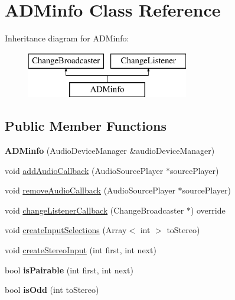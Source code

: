 \hypertarget{class_a_d_minfo}{}\section{A\+D\+Minfo Class Reference}
\label{class_a_d_minfo}
Inheritance diagram for A\+D\+Minfo\+:\begin{figure}[H]
\begin{center}
\leavevmode
\includegraphics[height=2.000000cm]{class_a_d_minfo}
\end{center}
\end{figure}
\subsection*{Public Member Functions}
\begin{DoxyCompactItemize}
\item 
\mbox{\label{class_a_d_minfo_a465ae1214edc18c2258dfaeb9b155772}} 
{\bfseries A\+D\+Minfo} (Audio\+Device\+Manager \&audio\+Device\+Manager)
\item 
void \mbox{\hyperlink{class_a_d_minfo_a27279299808cf4d425f7672ff3273157}{add\+Audio\+Callback}} (Audio\+Source\+Player $\ast$source\+Player)
\item 
void \mbox{\hyperlink{class_a_d_minfo_ac8fa936c018bd75d01fafd2b8c8ad3f6}{remove\+Audio\+Callback}} (Audio\+Source\+Player $\ast$source\+Player)
\item 
void \mbox{\hyperlink{class_a_d_minfo_a50ddf84b1a57b99420f32c627040cde1}{change\+Listener\+Callback}} (Change\+Broadcaster $\ast$) override
\item 
void \mbox{\hyperlink{class_a_d_minfo_a26182cce57f898d5b566ffee14e5e492}{create\+Input\+Selections}} (Array$<$ int $>$ to\+Stereo)
\item 
void \mbox{\hyperlink{class_a_d_minfo_abddde8902010e825e82f3890e0f4280e}{create\+Stereo\+Input}} (int first, int next)
\item 
\mbox{\label{class_a_d_minfo_ae375704718016ff06678454af97371e6}} 
bool {\bfseries is\+Pairable} (int first, int next)
\item 
\mbox{\label{class_a_d_minfo_af04f031ff72359c16af547bd1935aa7e}} 
bool {\bfseries is\+Odd} (int to\+Stereo)
\end{DoxyCompactItemize}
